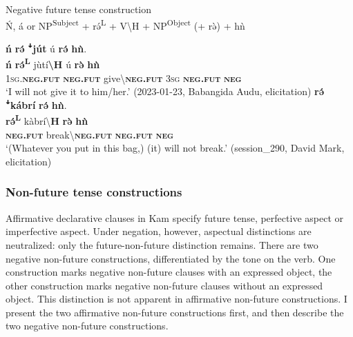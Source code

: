 \documentclass[output=paper,colorlinks,citecolor=brown]{langscibook}
\begin{document}
\ea\label{ex:kam:12} 
    Negative future tense construction\\
    \'{N}, á or NP\textsuperscript{Subject} + rə́\textsuperscript{L} + V{\textbackslash}H + NP\textsuperscript{Object} (+ rə̀) + hǹ
\z 

\ea\label{ex:kam:13} 
    \glll \textbf{ń} \textbf{rə́} \textbf{ꜜjút} ú \textbf{rə́} \textbf{hǹ}.\\
        \textbf{ń} \textbf{rə́\textsuperscript{L}} jùtí\textbf{{\textbackslash}H} ú \textbf{rə̀} \textbf{hǹ}\\
        \textsc{1sg}.\textbf{\textsc{neg}}\textbf{.\textsc{fut}} \textbf{\textsc{neg}}\textbf{.\textsc{fut}} give{\textbackslash}\textbf{\textsc{neg}}\textbf{.\textsc{fut}} \textsc{3sg} \textbf{\textsc{neg}}\textbf{.\textsc{fut}} \textbf{\textsc{neg}}\\
    \glt ‘I will not give it to him/her.’ (2023-01-23, Babangida Audu, elicitation)
\z 
\ea\label{ex:kam:14} 
    \glll \textbf{rə́} \textbf{ꜜkábrí} \textbf{rə́} \textbf{hǹ}.\\
        \textbf{rə́\textsuperscript{L}} kàbrí{\textbackslash}\textbf{H} \textbf{rə̀} \textbf{hǹ}\\
        \textbf{\textsc{neg}}\textbf{.\textsc{fut}} break{\textbackslash}\textbf{\textsc{neg}}\textbf{.\textsc{fut}} \textbf{\textsc{neg}}\textbf{.\textsc{fut}} \textbf{\textsc{neg}}\\
    \glt ‘(Whatever you put in this bag,) (it) will not break.’ (session\_290, David Mark, elicitation)
\z 
\subsubsection{Non-future tense constructions}\label{sec:kam:2.1.3}

Affirmative declarative clauses in Kam specify future tense, perfective aspect or imperfective aspect. Under negation, however, aspectual distinctions are neutralized: only the future-non-future distinction remains. There are two negative non-future constructions, differentiated by the tone on the verb. One construction marks negative non-future clauses with an expressed object, the other construction marks negative non-future clauses without an expressed object. This distinction is not apparent in affirmative non-future constructions. I present the two affirmative non-future constructions first, and then describe the two negative non-future constructions. 
\end{document}
